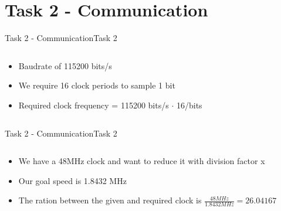 
\section{Task 2 - Communication}

\begin{frame}[fragile]{Task 2 - Communication}{Task 2}
  \begin{solution}
    \begin{columns}
      \begin{column}{0.8\textwidth}
        \begin{itemize}
          \item Baudrate of 115200 bits/s
          \item We require 16 clock periods to sample 1 bit
          \item Required clock frequency = 115200 bits/s $\cdot$ 16/bits
        \end{itemize}
      \end{column}
    \end{columns}
  \end{solution}
\end{frame}

\begin{frame}[fragile]{Task 2 - Communication}{Task 2}
  \begin{solution}
    \begin{columns}
      \begin{column}{0.8\textwidth}
        \begin{itemize}
          \item We have a 48MHz clock and want to reduce it with division factor x
          \item Our goal speed is 1.8432 MHz
          \item The ration between the given and required clock is $\frac{48MHz}{1.8432MHz} = 26.04167$
        \end{itemize}
      \end{column}
    \end{columns}
  \end{solution}
\end{frame}

